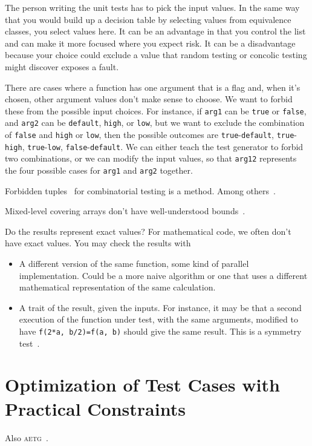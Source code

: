 \documentclass{juliacon}
\begin{document}
\vskip 6pt
The person writing the unit tests has to pick the input values. In the same way that you would build up a decision table by selecting values from equivalence classes, you select values here. It can be an advantage in that you control the list and can make it more focused where you expect risk. It can be a disadvantage because your choice could exclude a value that random testing or concolic testing might discover exposes a fault.

\vskip 6pt
There are cases where a function has one argument that is a flag and, when it's chosen, other argument values don't make sense to choose. We want to forbid these from the possible input choices. For instance, if \verb|arg1| can be \verb|true| or \verb|false|, and \verb|arg2| can be \verb|default|, \verb|high|, or \verb|low|, but we want to exclude the combination of \verb|false| and \verb|high| or \verb|low|, then the possible outcomes are \verb|true|-\verb|default|, \verb|true|-\verb|high|, \verb|true|-\verb|low|, \verb|false|-\verb|default|. We can either teach the test generator to forbid two combinations, or we can modify the input values, so that \verb|arg12| represents the four possible cases for \verb|arg1| and \verb|arg2| together.

Forbidden tuples~\cite{Petke2015-ex} for combinatorial testing is a method. Among others~\cite{Grindal2006-vy}.

Mixed-level covering arrays don't have well-understood bounds~\cite{Cohen2003-pg}.

\vskip 6pt
Do the results represent exact values? For mathematical code, we often don't have exact values. You may check the results with
\begin{itemize}
   \item A different version of the same function, some kind of parallel implementation. Could be a more naive algorithm or one that uses a different mathematical representation of the same calculation.
   \item A trait of the result, given the inputs. For instance, it may be that a second execution of the function under test, with the same arguments, modified to have \verb|f(2*a, b/2)=f(a, b)| should give the same result. This is a symmetry test~\cite{Segura2016-qh}.
\end{itemize}

\section{Optimization of Test Cases with Practical Constraints}
Also \textsc{aetg}~\cite{Cohen1997-lb}.
\end{document}
